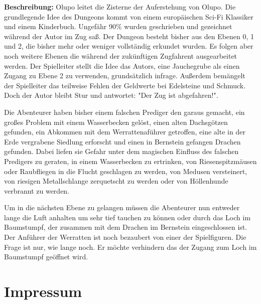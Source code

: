 \documentclass[11pt]{wbzine}
\begin{document}
\begin{multicols}{2}
\textbf{Beschreibung:} Olupo leitet die Zisterne der Auferstehung von
Olupo. Die grundlegende Idee des Dungeons kommt von einem europäischen
Sci-Fi Klassiker und einem Kinderbuch. Ungefähr 90\% wurden geschrieben
und gezeichnet während der Autor im Zug saß. Der Dungeon besteht bisher
aus den Ebenen 0, 1 und 2, die bisher mehr oder weniger vollständig
erkundet wurden. Es folgen aber noch weitere Ebenen die während der
zukünftigen Zugfahrent ausgearbeitet werden. Der Spielleiter stellt
die Idee das Autors, eine Jauchegrube als einen Zugang zu Ebene 2 zu
verwenden, grundsätzlich infrage. Außerdem bemängelt der Spielleiter
das teilweise Fehlen der Geldwerte bei Edelsteine und Schmuck. Doch der
Autor bleibt Stur und antwortet: "Der Zug ist abgefahren!".

Die Abenteurer haben bisher einem falschen Prediger den garaus gemacht,
ein großes Problem mit einem Wasserbecken gelöst, einen alten
Dachsgötzen gefunden, ein Abkommen mit dem Werrattenaführer getroffen,
eine alte in der Erde vergrabene Siedlung erforscht und einen in Bernstein
gefangen Drachen gefunden. Dabei liefen sie Gefahr unter dem magischen
Einfluss des falschen Predigers zu geraten, in einem Wasserbecken
zu ertrinken, von Riesenspitzmäusen oder Raubfliegen in die Flucht
geschlagen zu werden, von Medusen versteinert, von riesigen Metallschlange
zerquetscht zu werden oder von Höllenhunde verbrannt zu werden.

Um in die nächsten Ebene zu gelangen müssen die Abenteurer nun
entweder lange die Luft anhalten um sehr tief tauchen zu können oder
durch das Loch im Baumstumpf, der zusammen mit dem Drachen im Bernstein
eingeschlossen ist. Der Anführer der Werratten ist noch bezaubert von
einer der Spielfiguren. Die Frage ist nur, wie lange noch. Er möchte
verhindern das der Zugang zum Loch im Baumstumpf geöffnet wird.

\end{multicols}





\begin{multicols}{2}




\end{multicols}

\section{Impressum}
\end{document}
